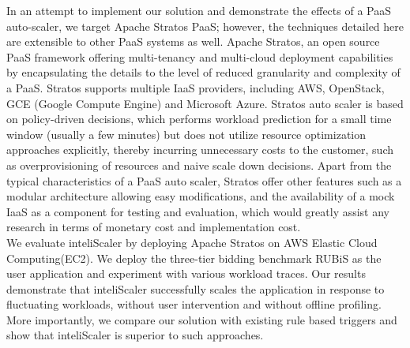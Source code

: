 In an attempt to implement our solution and demonstrate the effects of a PaaS auto-scaler, we target Apache Stratos PaaS; however, the techniques detailed here are extensible to other PaaS systems as well. Apache Stratos, an open source PaaS framework offering multi-tenancy and multi-cloud deployment capabilities by encapsulating the details to the level of reduced granularity and complexity of a PaaS. Stratos supports multiple IaaS providers, including AWS, OpenStack, GCE (Google Compute Engine) and Microsoft Azure\cite{website:stratos}. Stratos auto scaler is based on policy-driven  decisions, which performs workload prediction for a small time window (usually a few minutes) but does not utilize resource optimization approaches explicitly, thereby incurring unnecessary costs to the customer, such as overprovisioning of resources and naive scale down decisions. Apart from the typical characteristics of a PaaS auto scaler, Stratos offer other features such as a modular architecture allowing easy modifications, and the availability of a mock IaaS as a component for testing and evaluation, which would greatly assist any research in terms of monetary cost and implementation cost.\\

We evaluate inteliScaler by deploying  Apache Stratos on AWS Elastic Cloud Computing(EC2). We deploy the three-tier bidding benchmark RUBiS as the user application and experiment with various workload traces. Our results demonstrate that inteliScaler successfully scales the application in response to fluctuating workloads, without user intervention and without offline profiling. More importantly, we compare our solution with existing rule based triggers and show that inteliScaler is superior to such approaches.\\

